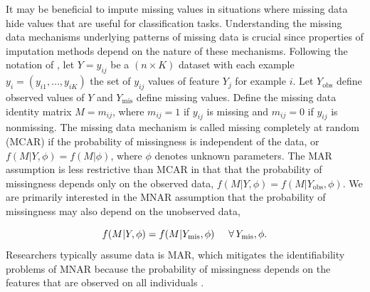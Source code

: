 \documentclass[10pt]{book}
\theoremstyle{definition}
\begin{document}
It may be beneficial to impute missing values in situations where missing data hide values that are useful for classification tasks. Understanding the missing data mechanisms underlying patterns of missing data is crucial since properties of imputation methods depend on the nature of these mechanisms. Following the notation of \cite{little2014}, let $Y = y_{ij}$ be a $(n \times K)$ dataset with each example $y_i = (y_{i1}, \ldots, y_{iK})$ the set of $y_{ij}$ values of feature $Y_j$ for example $i$. Let $Y_{\mathrm{obs}}$ define observed values of $Y$ and $Y_{\mathrm{mis}}$ define missing values. Define the missing data identity matrix $M = m_{ij}$, where $m_{ij} = 1$ if $y_{ij}$ is missing and $m_{ij} = 0$ if $y_{ij}$ is nonmissing. The missing data mechanism is called missing completely at random (MCAR) if the probability of missingness is independent of the data, or $f(M | Y, \phi) = f(M | \phi)$, where $\phi$ denotes unknown parameters. The MAR assumption is less restrictive than MCAR in that that the probability of missingness depends only on the observed data, $f(M | Y, \phi) = f(M | Y_{\mathrm{obs}}, \phi)$. We are primarily interested in the MNAR assumption that the probability of missingness may also depend on the unobserved data, 

\begin{equation}\label{2.1}
f(M | Y, \phi) = f(M | Y_{\mathrm{mis}}, \phi) \hspace{5mm} \forall \,Y_{\mathrm{mis}}, \phi.
\end{equation} Researchers typically assume data is MAR, which mitigates the identifiability problems of MNAR because the probability of missingness depends on the features that are observed on all individuals \citep{tsiatis2007}. 

\par			
{} \label{section:techniques} 
\end{document}
